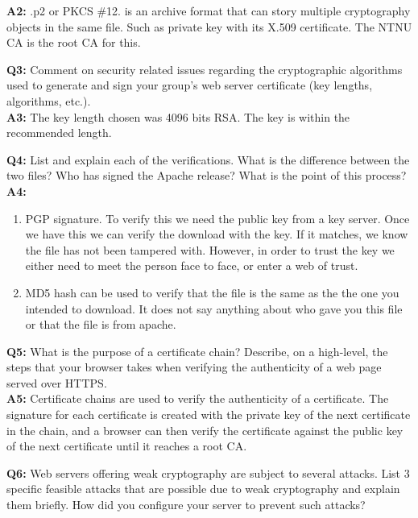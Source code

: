 \documentclass[paper=a4, fontsize=11pt]{article}
\begin{document}
    \textbf{A2:} .p2 or PKCS \#12. is an archive format that can story multiple
    cryptography objects in the same file. Such as private key with its X.509
    certificate. The NTNU CA is the root CA for this.

    \textbf{Q3:} Comment on security related issues regarding the cryptographic
    algorithms used to generate and sign your group’s web server certificate
    (key lengths, algorithms, etc.).\\

    \textbf{A3:} The key length chosen was 4096 bits RSA. The key is within the
    recommended length.

    \textbf{Q4:} List and explain each of the verifications. What is the
    difference between the two files?  Who has signed the Apache release? What
    is the point of this process?\\

    \textbf{A4:} 
    \begin{enumerate}
        \item PGP signature. To verify this we need the public key from a
            key server. Once we have this we can verify the download with the
            key. If it matches, we know the file has not been tampered with.
            However, in order to trust the key we either need to meet the
            person face to face, or enter a web of trust.
        \item MD5 hash can be used to verify that the file is the same as the
            the one you intended to download. It does not say anything about
            who gave you this file or that the file is from apache.
    \end{enumerate}

    \textbf{Q5:} What is the purpose of a certificate chain? Describe, on a
    high-level, the steps that your browser takes when verifying the
    authenticity of a web page served over HTTPS.\\

    \textbf{A5:} Certificate chains are used to verify the authenticity of a
    certificate. The signature for each certificate is created with the private
    key of the next certificate in the chain, and a browser can then verify the
    certificate against the public key of the next certificate until it reaches
    a root CA.

    \textbf{Q6:} Web servers offering weak cryptography are subject to several
    attacks. List 3 specific feasible attacks that are possible due to weak
    cryptography and explain them briefly. How did you configure your server to
    prevent such attacks?\\
\end{document}
